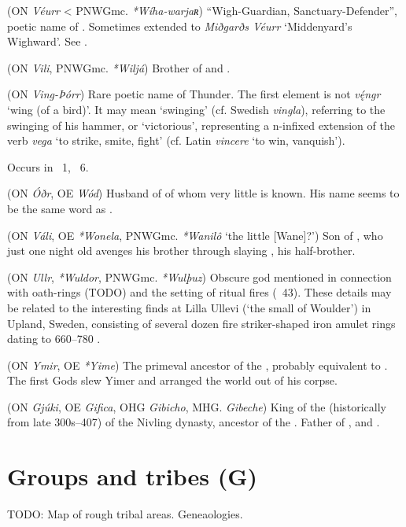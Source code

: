 \begin{itemize}
 (ON \emph{Véurr} < PNWGmc. \emph{*Wíha-warjaʀ})
  “Wigh-Guardian, Sanctuary-Defender”, poetic name of .  Sometimes extended to \emph{Miðgarðs Véurr} ‘Middenyard’s Wighward’.  See .

 (ON \emph{Vili}, PNWGmc. \emph{*Wiljá})
  Brother of  and .

 (ON \emph{Ving-Þórr})
  Rare poetic name of Thunder.  The first element is not \emph{vę́ngr} ‘wing (of a bird)’.  It may mean ‘swinging’ (cf. Swedish \emph{vingla}), referring to the swinging of his hammer, or ‘victorious’, representing a n-infixed extension of the verb \emph{vega} ‘to strike, smite, fight’ (cf. Latin \emph{vincere} ‘to win, vanquish’).

  Occurs in \Thrymskvida\ 1, \Allvismal\ 6.

 (ON \emph{Óðr}, OE \emph{Wód})
  Husband of  of whom very little is known.  His name seems to be the same word as .

 (ON \emph{Váli}, OE \emph{*Wonela}, PNWGmc. \emph{*Wanilô} ‘the little [Wane]?’)
  Son of , who just one night old avenges his brother  through slaying , his half-brother.

 (ON \emph{Ullr}, \emph{*Wuldor}, PNWGmc. \emph{*Wulþuz})
  Obscure god mentioned in connection with oath-rings (TODO) and the setting of ritual fires (\Grimnismal\ 43). These details may be related to the interesting finds at Lilla Ullevi (‘the small  of Woulder’) in Upland, Sweden, consisting of several dozen fire striker-shaped iron amulet rings dating to 660–780 \textcite{afEdholm2009}.

 (ON \emph{Ymir}, OE \emph{*Yime})
  The primeval ancestor of the , probably equivalent to .  The first Gods slew Yimer and arranged the world out of his corpse.

 (ON \emph{Gjúki}, OE \emph{Gifica}, OHG \emph{Gibicho}, MHG. \emph{Gibeche})
  King of the  (historically from late 300s–407) of the Nivling dynasty, ancestor of the . Father of ,  and .
\end{itemize}

\section{Groups and tribes (G)}
TODO: Map of rough tribal areas. Geneaologies.

